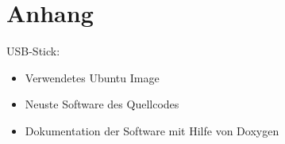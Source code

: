 \section{Anhang}

USB-Stick:
\begin{itemize}
\item Verwendetes Ubuntu Image
\item Neuste Software des Quellcodes
\item Dokumentation der Software mit Hilfe von Doxygen
\end{itemize}